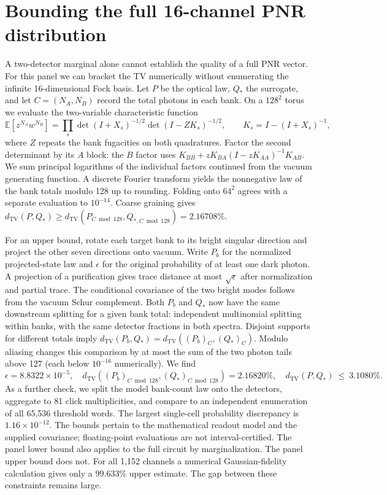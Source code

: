 \documentclass[11pt]{article}
\newcommand{\TV}{d_{\mathrm{TV}}}
\newcommand{\E}{\mathbb{E}}
\begin{document}
\section{Bounding the full 16-channel PNR distribution}
A two-detector marginal alone cannot establish the quality of a full PNR vector. For this panel we can bracket the TV numerically without enumerating the infinite 16-dimensional Fock basis. Let $P$ be the optical law, $Q_*$ the surrogate, and let $C=(N_A,N_B)$ record the total photons in each bank. On a $128^2$ torus we evaluate the two-variable characteristic function
\begin{equation}
 \E[z^{N_A}w^{N_B}]
 =\prod_s\det(I+X_s)^{-1/2}
       \det(I-ZK_s)^{-1/2},\qquad
 K_s=I-(I+X_s)^{-1},
 \label{eq:torus}
\end{equation}
where $Z$ repeats the bank fugacities on both quadratures. Factor the second determinant by its $A$ block: the $B$ factor uses $K_{BB}+zK_{BA}(I-zK_{AA})^{-1}K_{AB}$. We sum principal logarithms of the individual factors continued from the vacuum generating function. A discrete Fourier transform yields the nonnegative law of the bank totals modulo 128 up to rounding. Folding onto $64^2$ agrees with a separate evaluation to $10^{-14}$. Coarse graining gives $\TV(P,Q_*)\geq\TV(P_{C\bmod128},Q_{*,C\bmod128})=2.16708\%$.

For an upper bound, rotate each target bank to its bright singular direction and project the other seven directions onto vacuum. Write $P_b$ for the normalized projected-state law and $\epsilon$ for the original probability of at least one dark photon. A projection of a purification gives trace distance at most $\sqrt\epsilon$ after normalization and partial trace. The conditional covariance of the two bright modes follows from the vacuum Schur complement. Both $P_b$ and $Q_*$ now have the same downstream splitting for a given bank total: independent multinomial splitting within banks, with the same detector fractions in both spectra. Disjoint supports for different totals imply
$\TV(P_b,Q_*)=\TV((P_b)_C,(Q_*)_C)$. Modulo aliasing changes this comparison by at most the sum of the two photon tails above 127 (each below $10^{-16}$ numerically). We find
\begin{equation}
 \epsilon=8.8322\times10^{-5},\quad
 \TV((P_b)_{C\bmod128},(Q_*)_{C\bmod128})=2.16820\%,
 \quad \TV(P,Q_*)\ \le\ 3.1080\% .
\end{equation}
As a further check, we split the model bank-count law onto the detectors, aggregate to 81 click multiplicities, and compare to an independent enumeration of all 65,536 threshold words. The largest single-cell probability discrepancy is $1.16\times10^{-12}$. The bounds pertain to the mathematical readout model and the supplied covariance; floating-point evaluations are not interval-certified. The panel lower bound also applies to the full circuit by marginalization. The panel upper bound does not. For all 1,152 channels a numerical Gaussian-fidelity calculation \cite{fidelity} gives only a $99.633\%$ upper estimate. The gap between these constraints remains large.
\end{document}

